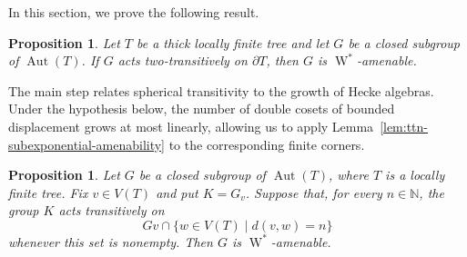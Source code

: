 \documentclass[11pt]{amsart}
\numberwithin{equation}{section}
\newcommand{\nn}{\mathbb N}
\DeclareMathOperator{\Aut}{Aut}
\newcommand{\Wstar}{\operatorname{W}^*}
\newtheorem{Prop}[The]{Proposition}
\theoremstyle{definition}
\begin{document}
In this section, we prove the following result.

\begin{Prop}
    \label{prop:ttn-boundary-amenability}
    Let $T$ be a thick locally finite tree and let $G$ be a closed subgroup of $\Aut(T)$. If $G$ acts two-transitively on $\partial T$, then $G$ is $\Wstar$-amenable.
\end{Prop}

The main step relates spherical transitivity to the growth of Hecke algebras. Under the hypothesis below, the number of double cosets of bounded displacement grows at most linearly, allowing us to apply Lemma~\ref{lem:ttn-subexponential-amenability} to the corresponding finite corners.

\begin{Prop}
    \label{prop:ttn-spherical-amenability}
    Let $G$ be a closed subgroup of $\Aut(T)$, where $T$ is a locally finite tree. Fix $v\in V(T)$ and put $K=G_v$. Suppose that, for every $n\in\nn$, the group $K$ acts transitively on
    $$
        Gv\cap\{w\in V(T)\mid d(v,w)=n\}
    $$
    whenever this set is nonempty. Then $G$ is $\Wstar$-amenable.
\end{Prop}
\end{document}
